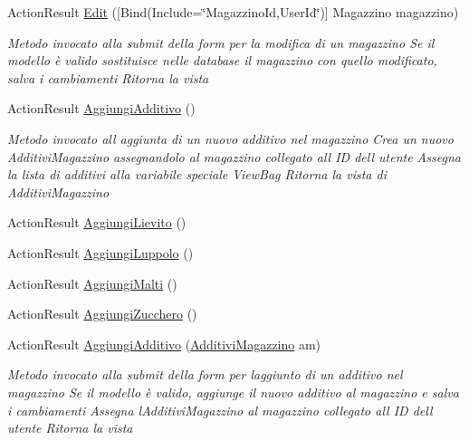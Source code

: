 \begin{DoxyCompactItemize}
\item 
Action\+Result \mbox{\hyperlink{class_brew_day2_1_1_controllers_1_1_magazzino_controller_af8b07601ae4d2c4dedba7a95b029347c}{Edit}} (\mbox{[}Bind(Include=\char`\"{}Magazzino\+Id,User\+Id\char`\"{})\mbox{]} Magazzino magazzino)
\begin{DoxyCompactList}\small\item\em Metodo invocato alla submit della form per la modifica di un magazzino Se il modello è valido sostituisce nelle database il magazzino con quello modificato, salva i cambiamenti Ritorna la vista \end{DoxyCompactList}\item 
Action\+Result \mbox{\hyperlink{class_brew_day2_1_1_controllers_1_1_magazzino_controller_a41e900928edeabedf141af5ecb5d4a8a}{Aggiungi\+Additivo}} ()
\begin{DoxyCompactList}\small\item\em Metodo invocato all\textquotesingle{} aggiunta di un nuovo additivo nel magazzino Crea un nuovo Additivi\+Magazzino assegnandolo al magazzino collegato all\textquotesingle{} ID dell\textquotesingle{} utente Assegna la lista di additivi alla variabile speciale View\+Bag Ritorna la vista di Additivi\+Magazzino \end{DoxyCompactList}\item 
Action\+Result \mbox{\hyperlink{class_brew_day2_1_1_controllers_1_1_magazzino_controller_a4f1a71e54925a34c77a7615d9fb47f86}{Aggiungi\+Lievito}} ()
\item 
Action\+Result \mbox{\hyperlink{class_brew_day2_1_1_controllers_1_1_magazzino_controller_a7bab72a060f100e30f5628196fec5f19}{Aggiungi\+Luppolo}} ()
\item 
Action\+Result \mbox{\hyperlink{class_brew_day2_1_1_controllers_1_1_magazzino_controller_a5915a701c7cec6326572a889599eaed4}{Aggiungi\+Malti}} ()
\item 
Action\+Result \mbox{\hyperlink{class_brew_day2_1_1_controllers_1_1_magazzino_controller_ad4616bed1e6686828ef3f177846e2fe2}{Aggiungi\+Zucchero}} ()
\item 
Action\+Result \mbox{\hyperlink{class_brew_day2_1_1_controllers_1_1_magazzino_controller_a01eb9baa8099142e115592797ecc2e1f}{Aggiungi\+Additivo}} (\mbox{\hyperlink{class_brew_day2_1_1_models_1_1_additivi_magazzino}{Additivi\+Magazzino}} am)
\begin{DoxyCompactList}\small\item\em Metodo invocato alla submit della form per l\textquotesingle{}aggiunto di un additivo nel magazzino Se il modello è valido, aggiunge il nuovo additivo al magazzino e salva i cambiamenti Assegna l\textquotesingle{}Additivi\+Magazzino al magazzino collegato all\textquotesingle{} ID dell\textquotesingle{} utente Ritorna la vista \end{DoxyCompactList}\item 

\end{DoxyCompactItemize}

